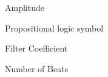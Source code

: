 Amplitude

\term{\hbox{\&}}Propositional logic symbol 

Filter Coefficient\cite{raharjo2015belajar}

\bigskip

Number of Beats